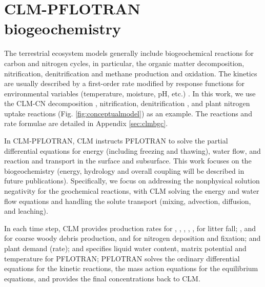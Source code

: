 \documentclass[gmd, manuscript]{copernicus}
\begin{document}
\section{CLM-PFLOTRAN biogeochemistry}
The terrestrial ecosystem models generally include biogeochemical reactions for
carbon and nitrogen cycles, in particular, the organic matter decomposition,
nitrification, denitrification and methane production and oxidation. The
kinetics are usually described by a first-order rate modified by response
functions for environmental variables (temperature, moisture, pH, etc.)
\citep{Bonan2012,Boyer2006,Schmidt2011}.  In this work, we use the CLM-CN
decomposition \citep{Bonan2012,Oleson2013,Thornton2005}, nitrification,
denitrification \citep{Dickinson2002,Parton2001,Parton1996}, and plant nitrogen
uptake reactions (Fig. \ref{fig:conceptualmodel}) as an example. The reactions
and rate formulae are detailed in Appendix \ref{sec:clmbgc}.


In CLM-PFLOTRAN, CLM instructs PFLOTRAN to solve the partial differential
equations for energy (including freezing and thawing), water flow, and reaction
and transport in the surface and subsurface. This work focuses on the
biogeochemistry (energy, hydrology and overall coupling will be described in
future publications). Specifically, we focus on addressing the nonphysical
solution negativity for the geochemical reactions, with CLM solving the energy and water
flow equations and handling the solute transport (mixing, advection, diffusion,
and leaching).

In each time step, CLM provides production rates for ,
, , , ,  for litter
fall; , and  for coarse woody debris production,
 and  for nitrogen deposition and fixation; and
plant  demand (rate); and specifies liquid water content, matrix
potential and temperature for PFLOTRAN; PFLOTRAN solves the ordinary differential
equations for the kinetic reactions, the mass action equations for the
equilibrium equations, and provides the final concentrations back
to CLM.   
\end{document}
